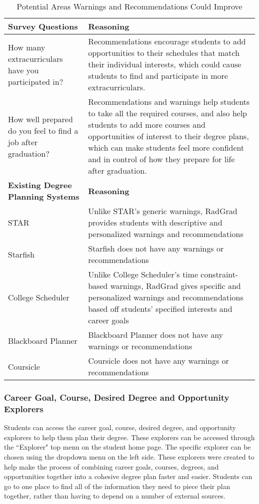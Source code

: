 \begin{table}[htbp!]
\centering
 \caption{Potential Areas Warnings and Recommendations Could Improve}
\begin{tabular}{  |p{4cm}|p{12cm}| } 
\hline
 \textbf{Survey Questions} & \textbf{Reasoning} \\ 
  \hline
  How many extracurriculars have you participated in? & Recommendations encourage students to add opportunities to their schedules that match their individual interests, which could cause students to find and participate in more extracurriculars.\\
  \hline
  How well prepared do you feel to find a job after graduation? & Recommendations and warnings help students to take all the required courses, and also help students to add more courses and opportunities of interest to their degree plans, which can make students feel more confident and in control of how they prepare for life after graduation. \\
  \hline
   \textbf{Existing Degree Planning Systems} & \textbf{Reasoning} \\ 
  \hline
  STAR & Unlike STAR's generic warnings, RadGrad provides students with descriptive and personalized warnings and recommendations \\
    \hline
  Starfish & Starfish does not have any warnings or recommendations\\
    \hline
  College Scheduler &  Unlike College Scheduler's time constraint-based warnings, RadGrad gives specific and personalized warnings and recommendations based off students' specified interests and career goals\\
    \hline
  Blackboard Planner & Blackboard Planner does not have any warnings or recommendations\\
    \hline
  Coursicle & Coursicle does not have any warnings or recommendations \\
  \hline
  \end{tabular}
\end{table}

\subsubsection{Career Goal, Course, Desired Degree and Opportunity Explorers}

Students can access the career goal, course, desired degree, and opportunity explorers to help them plan their degree.  These explorers can be accessed through the ``Explorer" top menu on the student home page. The specific explorer can be chosen using the dropdown menu on the left side. These explorers were created to help make the process of combining career goals, courses, degrees, and opportunities together into a cohesive degree plan faster and easier. Students can go to one place to find all of the information they need to piece their plan together, rather than having to depend on a number of external sources.


